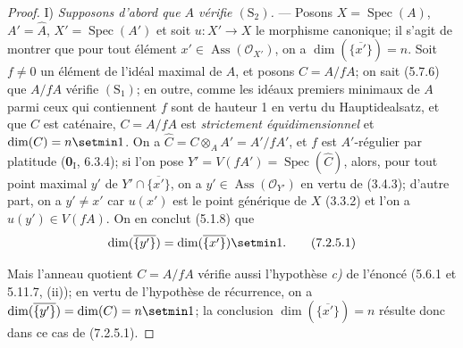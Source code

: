 \begin{proof}
\medskip\noindent
I) \emph{Supposons d'abord que $A$ vérifie $(\mathrm S_2)$.} --- Posons
$X=\operatorname{Spec}(A)$, $A'=\widehat A$,
$X'=\operatorname{Spec}(A')$ et soit $u:X'\to X$ le morphisme canonique;
il s'agit de montrer que pour tout élément
$x'\in\operatorname{Ass}(\mathscr O_{X'})$, on a
$\dim(\overline{\{x'\}})=n$. Soit $f\neq0$ un élément de l'idéal maximal
de $A$, et posons $C=A/fA$; on sait (5.7.6) que $A/fA$ vérifie
$(\mathrm S_1)$; en outre, comme les idéaux premiers minimaux de $A$ parmi
ceux qui contiennent $f$ sont de hauteur 1 en vertu du Hauptidealsatz, et
que $C$ est caténaire, $C=A/fA$ est \emph{strictement équidimensionnel} et
$\dim(C)=n\setmin 1$. On a
$\widehat C=C\otimes_AA'=A'/fA'$, et $f$ est $A'$-régulier par platitude
(\textbf{0}$_{\mathrm I}$, 6.3.4); si l'on pose
$Y'=V(fA')=\operatorname{Spec}(\widehat C)$, alors, pour tout point maximal
$y'$ de $Y'\cap\overline{\{x'\}}$, on a
$y'\in\operatorname{Ass}(\mathscr O_{Y'})$ en vertu de (3.4.3); d'autre
part, on a $y'\neq x'$ car $u(x')$ est le point générique de $X$ (3.3.2)
et l'on a $u(y')\in V(fA)$. On en conclut (5.1.8) que
\begin{equation}
\dim(\overline{\{y'\}})=\dim(\overline{\{x'\}})\setmin 1.
\tag{7.2.5.1}
\label{IV.2.eq.7.2.5.1-fr}
\end{equation}

Mais l'anneau quotient $C=A/fA$ vérifie aussi l'hypothèse \emph{c)} de l'énoncé
(5.6.1 et 5.11.7, (ii)); en vertu de l'hypothèse de récurrence, on a
$\dim(\overline{\{y'\}})=\dim(C)=n\setmin 1$; la conclusion
$\dim(\overline{\{x'\}})=n$ résulte donc dans ce cas de (7.2.5.1).


\end{proof}
